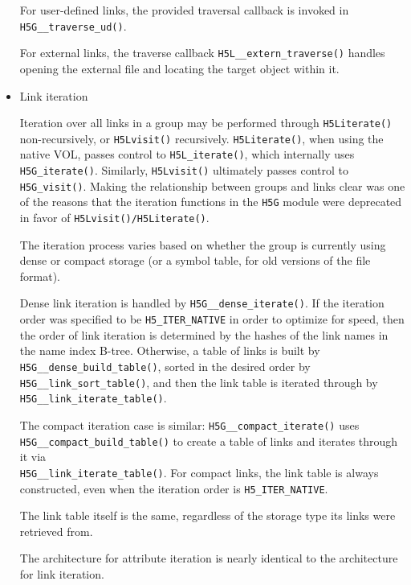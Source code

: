 \begin{itemize}
For user-defined links, the provided traversal callback is invoked in \texttt{H5G\_\_traverse\_ud()}. 

For external links, the traverse callback \texttt{H5L\_\_extern\_traverse()} handles opening the external file and locating the target object within it.

    \item Link iteration

Iteration over all links in a group may be performed through \texttt{H5Literate()} non-recursively, or \texttt{H5Lvisit()} recursively. \texttt{H5Literate()}, when using the native VOL, passes control to \texttt{H5L\_iterate()}, which internally uses \texttt{H5G\_iterate()}. Similarly, \texttt{H5Lvisit()} ultimately passes control to \texttt{H5G\_visit()}. Making the relationship between groups and links clear was one of the reasons that the iteration functions in the \texttt{H5G} module were deprecated in favor of \texttt{H5Lvisit()/H5Literate()}. 

The iteration process varies based on whether the group is currently using dense or compact storage (or a symbol table, for old versions of the file format). 

Dense link iteration is handled by \texttt{H5G\_\_dense\_iterate()}. If the iteration order was specified to be \texttt{H5\_ITER\_NATIVE} in order to optimize for speed, then the order of link iteration is determined by the hashes of the link names in the name index B-tree. Otherwise, a table of links is built by \texttt{H5G\_\_dense\_build\_table()}, sorted in the desired order by \texttt{H5G\_\_link\_sort\_table()}, and then the link table is iterated through by \texttt{H5G\_\_link\_iterate\_table()}. %

The compact iteration case is similar: \texttt{H5G\_\_compact\_iterate()} uses \\ \texttt{H5G\_\_compact\_build\_table()} to create a table of links and iterates through it via \\ \texttt{H5G\_\_link\_iterate\_table()}. For compact links, the link table is always constructed, even when the iteration order is \texttt{H5\_ITER\_NATIVE}. 

The link table itself is the same, regardless of the storage type its links were retrieved from.

The architecture for attribute iteration is nearly identical to the architecture for link iteration.

\end{itemize}

